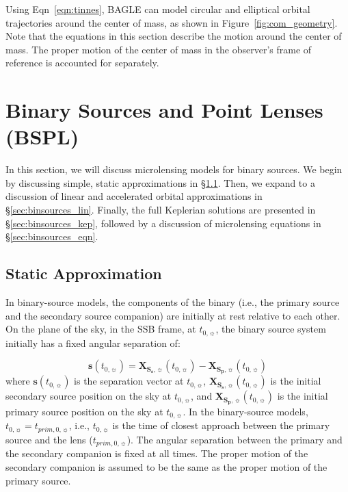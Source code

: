 \documentclass[twocolumn]{aastex701}
\newcommand{\vect}[1]{\boldsymbol{#1}}
\newcommand{\tnot}{t_{0,\sun}}
\newcommand{\Xspvec}{\vect{X}_{\boldsymbol{S_p},\sun}}
\newcommand{\Xssvec}{\vect{X}_{\boldsymbol{S_s},\sun}}
\newcommand{\tpnot}{t_{prim,0,\sun}}
\begin{document}
Using Eqn~\ref{eqn:tinnes}, BAGLE can model circular and elliptical orbital trajectories around the center of mass, as shown in Figure~\ref{fig:com_geometry}. Note that the equations in this section describe the motion around the center of mass. The proper motion of the center of mass in the observer's frame of reference is accounted for separately. 



\section{Binary Sources and Point Lenses (BSPL) \label{sec:binsource}}

In this section, we will discuss microlensing models for binary sources. We begin by discussing simple, static approximations in \S\ref{sec:binsources_static}. Then, we expand to a discussion of linear and accelerated orbital approximations in \S\ref{sec:binsources_lin}. Finally, the full Keplerian solutions are presented in \S\ref{sec:binsources_kep}, followed by a discussion of microlensing equations in \S\ref{sec:binsources_eqn}.

\subsection{Static Approximation}
\label{sec:binsources_static}

In binary-source models, the components of the binary (i.e., the primary source and the secondary source companion) are initially at rest relative to each other. On the plane of the sky, in the SSB frame, at $\tnot$, the binary source system initially has a fixed angular separation of:

\begin{equation}
    \vect{s}(\tnot) = \Xssvec(\tnot) - \Xspvec(\tnot)
\end{equation}
%
where $\vect{s}(\tnot)$ is the separation vector at $\tnot$, $\Xssvec(\tnot)$ is the initial secondary source position on the sky at $\tnot$, and $\Xspvec (\tnot)$ is the initial primary source position on the sky at $\tnot$. In the binary-source models, $\tnot = \tpnot$, i.e., $\tnot$ is the time of closest approach between the primary source and the lens ($\tpnot$). The angular separation between the primary and the secondary companion is fixed at all times. The proper motion of the secondary companion is assumed to be the same as the proper motion of the primary source. 
\end{document}
